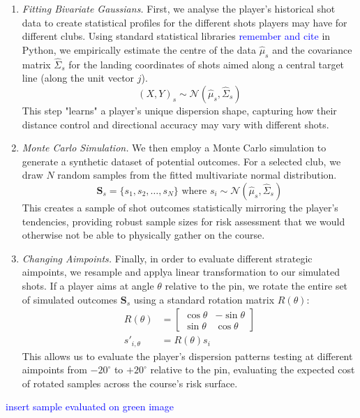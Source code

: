 \documentclass[11pt, letterpaper]{article}
\begin{document}
\begin{enumerate}
    \item \textit{Fitting Bivariate Gaussians.} First, we analyse the player's historical shot data to create statistical profiles for the different shots players may have for different clubs. Using standard statistical libraries \textcolor{blue}{remember and cite} in Python, we empirically estimate the centre of the data $\hat\mu_s$ and the covariance matrix $\hat\Sigma_s$ for the landing coordinates of shots aimed along a central target line (along the unit vector $j$). 
     \[(X,Y)_s \sim \mathcal{N}(\hat\mu_s, \hat\Sigma_s)\]   
     This step "learns" a player's unique dispersion shape, capturing how their distance control and directional accuracy may vary with different shots.

     \item \textit{Monte Carlo Simulation.} We then employ a Monte Carlo simulation to generate a synthetic dataset of potential outcomes. For a selected club, we draw $N$ random samples from the fitted multivariate normal distribution. 
     $$\mathbf{S}_s = \{s_1, s_2, \ldots, s_N\} \text{ where } s_i \sim \mathcal{N}(\hat\mu_s, \hat\Sigma_s)$$
     This creates a sample of shot outcomes statistically mirroring the player's tendencies, providing robust sample sizes for risk assessment that we would otherwise not be able to physically gather on the course.

     \item \textit{Changing Aimpoints.} Finally, in order to evaluate different strategic aimpoints, we resample and applya linear transformation to our simulated shots. If a player aims at angle $\theta$ relative to the pin, we rotate the entire set of simulated outcomes $\mathbf{S}_s$ using a standard rotation matrix $R(\theta)$:
     \begin{align*}
         R(\theta) &= \begin{bmatrix}
             \cos \theta & - \sin \theta \\
             \sin \theta & \cos \theta
         \end{bmatrix} \\
         s'_{i,\theta} &= R(\theta)s_i
     \end{align*}
     This allows us to evaluate the player's dispersion patterns testing at different aimpoints from $-20 ^\circ$ to $+20 ^\circ$ relative to the pin, evaluating the expected cost of rotated samples across the course's risk surface.
\end{enumerate}
\textcolor{blue}{insert sample evaluated on green image}
\end{document}
